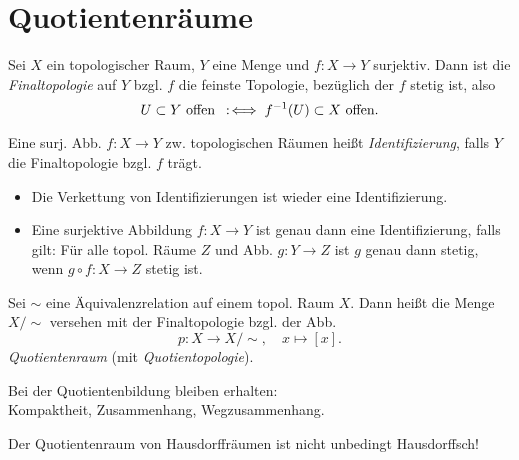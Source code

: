 \documentclass{cheat-sheet}
\newcommand{\inlineitem}[1]{\textbullet \enspace #1} %
\begin{document}
\section{Quotientenräume}

\begin{defn}
  Sei $X$ ein topologischer Raum, $Y$ eine Menge und $f : X \to Y$ surjektiv. Dann ist die \emph{Finaltopologie} auf $Y$ bzgl. $f$ die feinste Topologie, bezüglich der $f$ stetig ist, also
  \[ U \subset Y \text{ offen} \enspace:\!\iff f^{-1}(U) \subset X \text{ offen}. \]
\end{defn}

\begin{defn}
  Eine surj. Abb. $f \!:\! X \!\to\! Y$ zw. topologischen Räumen heißt \emph{Identifizierung}, falls
  $Y$ die Finaltopologie bzgl. $f$ trägt.
\end{defn}

\begin{prop}
  \begin{itemize}
    \item Die Verkettung von Identifizierungen ist wieder eine Identifizierung.
    \item Eine surjektive Abbildung $f : X  \to Y$ ist genau dann eine Identifizierung, falls gilt: Für alle topol. Räume $Z$ und Abb. $g : Y \to Z$ ist $g$ genau dann stetig, wenn $g \circ f : X \to Z$ stetig ist.
  \end{itemize}
\end{prop}

\begin{defn}
  Sei ${\sim}$ eine Äquivalenzrelation auf einem topol. Raum $X$. Dann heißt die Menge $X/{\sim}$ versehen mit der Finaltopologie bzgl. der Abb.
  \[ p : X \to X/{\sim}, \quad x \mapsto [x]. \]
   \emph{Quotientenraum} (mit \emph{Quotientopologie}).
\end{defn}

\begin{bem}
  Bei der Quotientenbildung bleiben erhalten: \\
  \inlineitem{Kompaktheit,} \enspace
  \inlineitem{Zusammenhang,} \enspace
  \inlineitem{Wegzusammenhang.}
\end{bem}

\begin{acht}
  Der Quotientenraum von Hausdorffräumen ist nicht unbedingt Hausdorffsch!
\end{acht}
\end{document}
